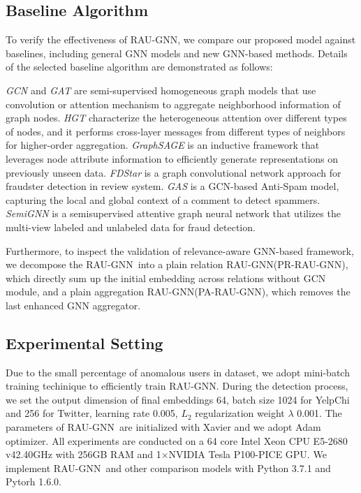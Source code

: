 \documentclass[conference]{IEEEtran}
\theoremstyle{definition}
\newcommand{\model}{\textsc{RAU-GNN}}
\begin{document}
\subsection{Baseline Algorithm}
To verify the effectiveness of \model, we compare our proposed model against baselines, including general GNN models and new GNN-based methods. Details of the selected baseline algorithm are demonstrated as follows:

\textit{GCN} and \textit{GAT} are  semi-supervised homogeneous graph models that use convolution or attention mechanism to aggregate neighborhood information of graph nodes.
\textit{HGT}\cite{hu2020heterogeneous} characterize the heterogeneous attention over different types of nodes, and it performs cross-layer messages from different types of neighbors for higher-order aggregation.
\textit{GraphSAGE} is an inductive framework that leverages node attribute information to efficiently generate representations on previously unseen data.
\textit{FDStar}\cite{wang2019fdgars} is a graph convolutional network approach for fraudster detection in review system.
\textit{GAS}\cite{li2019spam} is a GCN-based Anti-Spam model, capturing the local and global context of a comment to detect spammers.
\textit{SemiGNN} is a semisupervised attentive graph neural network that utilizes the multi-view labeled and unlabeled data for fraud detection. 

Furthermore, to inspect the validation of relevance-aware GNN-based framework, we decompose the \model~into a plain relation \model(PR-\model), which directly sum up the initial embedding across relations without GCN module, and a plain aggregation \model(PA-\model), which removes the last enhanced GNN aggregator. 

\subsection{Experimental Setting}
Due to the small percentage of anomalous users in dataset, we adopt mini-batch training techinique to efficiently train \model.
During the detection process, we set the output dimension of final embeddings 64, batch size 1024 for YelpChi and 256 for Twitter, learning rate 0.005, $L_2$ regularization weight $\lambda$ 0.001.
The parameters of \model~are initialized with Xavier and we adopt Adam optimizer. 
All experiments are conducted on a 64 core Intel Xeon CPU E5-2680 v4\@2.40GHz with 256GB RAM and 1$\times$NVIDIA Tesla P100-PICE GPU. We implement \model~and other comparison models with Python 3.7.1 and Pytorh 1.6.0.
\end{document}
